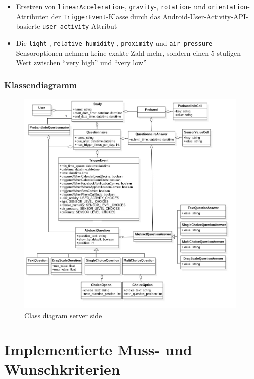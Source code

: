 \documentclass[a4paper]{scrreprt}
\begin{document}
\begin{itemize}
                \item Ersetzen von \texttt{linearAcceleration}-, \texttt{gravity}-, \texttt{rotation}- und \texttt{orientation}-Attributen der \texttt{TriggerEvent}-Klasse durch das Android-User-Activity-API-basierte \texttt{user\_activity}-Attribut

                \item Die \texttt{light}-, \texttt{relative\_humidity}-, \texttt{proximity} und \texttt{air\_pressure}-Sensoroptionen nehmen keine exakte Zahl mehr, sondern einen 5-stufigen Wert zwischen “very high” und “very low”


            \end{itemize}

            \subsection{Klassendiagramm}
                \begin{figure}[H]
                    \centering
                    \includegraphics[scale = 0.5]{class_diagram_server.jpg}
                    \caption{Class diagram server side}
                \end{figure}


        \newpage
    \chapter{Implementierte Muss- und Wunschkriterien}
\end{document}
